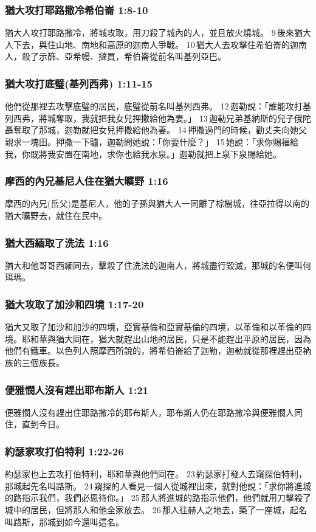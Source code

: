 \subsubsection{猶大攻打耶路撒冷希伯崙 1:8-10}
猶大人攻打耶路撒冷，將城攻取，用刀殺了城內的人，並且放火燒城。 9 後來猶大人下去，與住山地、南地和高原的迦南人爭戰。 10 猶大人去攻擊住希伯崙的迦南人，殺了示篩、亞希幔、撻買，希伯崙從前名叫基列亞巴。

\subsubsection{猶大攻打底璧(基列西弗) 1:11-15}
他們從那裡去攻擊底璧的居民，底璧從前名叫基列西弗。 12 迦勒說：「誰能攻打基列西弗，將城奪取，我就把我女兒押撒給他為妻。」 13 迦勒兄弟基納斯的兒子俄陀聶奪取了那城，迦勒就把女兒押撒給他為妻。 14 押撒過門的時候，勸丈夫向她父親求一塊田。押撒一下驢，迦勒問她說：「你要什麼？」 15 她說：「求你賜福給我，你既將我安置在南地，求你也給我水泉。」迦勒就把上泉下泉賜給她。

\subsubsection{摩西的內兄基尼人住在猶大曠野 1:16}
摩西的內兄(岳父)是基尼人，他的子孫與猶大人一同離了棕樹城，往亞拉得以南的猶大曠野去，就住在民中。

\subsubsection{猶大西緬取了洗法 1:16}
猶大和他哥哥西緬同去，擊殺了住洗法的迦南人，將城盡行毀滅，那城的名便叫何珥瑪。

\subsubsection{猶大攻取了加沙和四境 1:17-20}
猶大又取了加沙和加沙的四境，亞實基倫和亞實基倫的四境，以革倫和以革倫的四境。耶和華與猶大同在，猶大就趕出山地的居民，只是不能趕出平原的居民，因為他們有鐵車。以色列人照摩西所說的，將希伯崙給了迦勒，迦勒就從那裡趕出亞衲族的三個族長。

\subsubsection{便雅憫人沒有趕出耶布斯人 1:21}
便雅憫人沒有趕出住耶路撒冷的耶布斯人，耶布斯人仍在耶路撒冷與便雅憫人同住，直到今日。

\subsubsection{約瑟家攻打伯特利 1:22-26}
約瑟家也上去攻打伯特利，耶和華與他們同在。 23 約瑟家打發人去窺探伯特利，那城起先名叫路斯。 24 窺探的人看見一個人從城裡出來，就對他說：「求你將進城的路指示我們，我們必恩待你。」 25 那人將進城的路指示他們，他們就用刀擊殺了城中的居民，但將那人和他全家放去。 26 那人往赫人之地去，築了一座城，起名叫路斯，那城到如今還叫這名。

